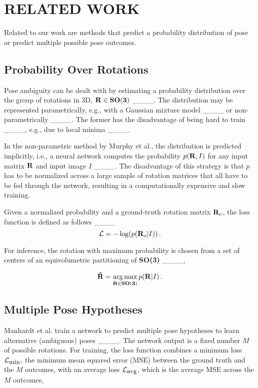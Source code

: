 \section{RELATED WORK}
Related to our work are methods that predict a probability distribution of pose or predict multiple possible pose outcomes.

\subsection{Probability Over Rotations}

Pose ambiguity can be dealt with by estimating a probability distribution over the group of rotations in 3D, ${\bf R} \in {\bf SO(3)}$ ____. The distribution may be represented parametrically, e.g., with a Gaussian mixture model ____ or non-parametrically ____. The former has the disadvantage of being hard to train ____, e.g., due to local minima ____.

In the non-parametric method by Murphy et al.,  the distribution is predicted implicitly, i.e., a neural network computes the probability $p({\bf R}, I)$ for any input matrix ${\bf R}$ and input image $I$ ____. The disadvantage of this strategy is that $p$ has to be normalized across a large sample of rotation matrices that all have to be fed through the network, resulting in a computationally expensive and slow training.

Given a normalized probability and a ground-truth rotation matrix ${\bf R}_o$, the loss function is defined as follows  ____
%
\begin{equation}\label{eq:prob_loss}
\mathcal{L} = - \log(p({\bf R}_o | I))\,.
\end{equation}
%

For inference, the rotation with maximum probability is chosen from a set of centers of an equivolumetric partitioning of {\bf SO(3)} ____,

\begin{equation}\label{eq:prob_inf}
{\bf \hat R} = \underset{{\bf R} \in {\bf SO(3)}}{\arg \max}\, p({\bf R} | I)\,.
\end{equation}

\subsection{Multiple Pose Hypotheses}

Manhardt et al. train a network to predict multiple pose hypotheses to learn alternative (ambiguous) poses ____. The network output is a fixed number $M$ of possible rotations. For training, the loss function combines a minimum loss $\mathcal{L}_{\mbox{\small min}}$, the minimum mean squared error (MSE) between the ground truth and the $M$ outcomes, with an average loss $\mathcal{L}_{\mbox{\small avg}}$, which is the average MSE across the $M$ outcomes,

